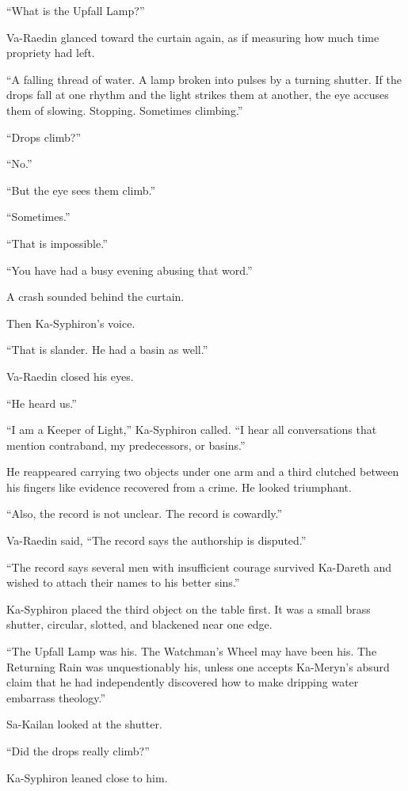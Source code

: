“What is the Upfall Lamp?”\par
Va-Raedin glanced toward the curtain again, as if measuring how much time propriety had left.\par
“A falling thread of water. A lamp broken into pulses by a turning shutter. If the drops fall at one rhythm and the light strikes them at another, the eye accuses them of slowing. Stopping. Sometimes climbing.”\par
“Drops climb?”\par
“No.”\par
“But the eye sees them climb.”\par
“Sometimes.”\par
“That is impossible.”\par
“You have had a busy evening abusing that word.”\par
A crash sounded behind the curtain.\par
Then Ka-Syphiron’s voice.\par
“That is slander. He had a basin as well.”\par
Va-Raedin closed his eyes.\par
“He heard us.”\par
“I am a Keeper of Light,” Ka-Syphiron called. “I hear all conversations that mention contraband, my predecessors, or basins.”\par
He reappeared carrying two objects under one arm and a third clutched between his fingers like evidence recovered from a crime. He looked triumphant.\par
“Also, the record is not unclear. The record is cowardly.”\par
Va-Raedin said, “The record says the authorship is disputed.”\par
“The record says several men with insufficient courage survived Ka-Dareth and wished to attach their names to his better sins.”\par
Ka-Syphiron placed the third object on the table first. It was a small brass shutter, circular, slotted, and blackened near one edge.\par
“The Upfall Lamp was his. The Watchman’s Wheel may have been his. The Returning Rain was unquestionably his, unless one accepts Ka-Meryn’s absurd claim that he had independently discovered how to make dripping water embarrass theology.”\par
Sa-Kailan looked at the shutter.\par
“Did the drops really climb?”\par
Ka-Syphiron leaned close to him.\par
